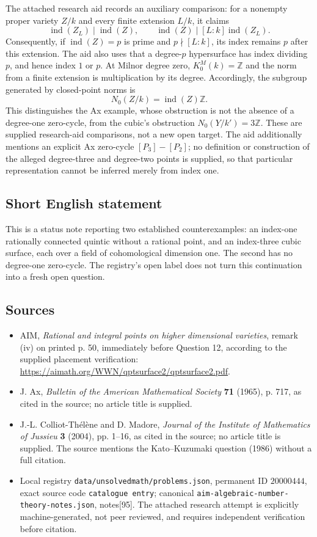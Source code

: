 \documentclass[11pt]{article}
\newcommand{\Z}{\mathbb{Z}}
\begin{document}
The attached research aid records an auxiliary comparison: for a nonempty proper variety \(Z/k\) and every finite extension \(L/k\), it claims
\[
\operatorname{ind}(Z_L)\mid\operatorname{ind}(Z),\qquad
\operatorname{ind}(Z)\mid[L:k]\operatorname{ind}(Z_L).
\]
Consequently, if \(\operatorname{ind}(Z)=p\) is prime and \(p\nmid[L:k]\), its index remains \(p\) after this extension. The aid also uses that a degree-\(p\) hypersurface has index dividing \(p\), and hence index \(1\) or \(p\). At Milnor degree zero, \(K^M_0(k)=\Z\) and the norm from a finite extension is multiplication by its degree. Accordingly, the subgroup generated by closed-point norms is
\[
N_0(Z/k)=\operatorname{ind}(Z)\Z.
\]
This distinguishes the Ax example, whose obstruction is not the absence of a degree-one zero-cycle, from the cubic's obstruction \(N_0(Y/k')=3\Z\). These are supplied research-aid comparisons, not a new open target. The aid additionally mentions an explicit Ax zero-cycle \([P_3]-[P_2]\); no definition or construction of the alleged degree-three and degree-two points is supplied, so that particular representation cannot be inferred merely from index one.
\subsection{Short English statement}
This is a status note reporting two established counterexamples: an index-one rationally connected quintic without a rational point, and an index-three cubic surface, each over a field of cohomological dimension one. The second has no degree-one zero-cycle. The registry's open label does not turn this continuation into a fresh open question.
\subsection{Sources}
\begin{itemize}
\item AIM, \emph{Rational and integral points on higher dimensional varieties}, remark (iv) on printed p. 50, immediately before Question 12, according to the supplied placement verification: \url{https://aimath.org/WWN/qptsurface2/qptsurface2.pdf}.
\item J. Ax, \emph{Bulletin of the American Mathematical Society} \textbf{71} (1965), p. 717, as cited in the source; no article title is supplied.
\item J.-L. Colliot-Th\'el\`ene and D. Madore, \emph{Journal of the Institute of Mathematics of Jussieu} \textbf{3} (2004), pp. 1--16, as cited in the source; no article title is supplied. The source mentions the Kato--Kuzumaki question (1986) without a full citation.
\item Local registry \texttt{data/unsolvedmath/problems.json}, permanent ID \(20000444\), exact source code \texttt{catalogue entry}; canonical \texttt{aim-algebraic-number-theory-notes.json}, notes[95]. The attached research attempt is explicitly machine-generated, not peer reviewed, and requires independent verification before citation.
\end{itemize}
\end{document}
